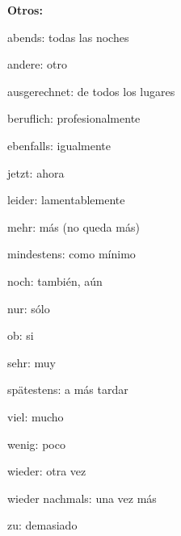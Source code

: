 \textbf{Otros:}
\begin{multicols}{3}
\begin{myitemize}
\item abends: todas las noches
\item andere: otro
\item ausgerechnet: de todos los lugares
\item beruflich: profesionalmente
\item ebenfalls: igualmente
\item jetzt: ahora
\item leider: lamentablemente
\item mehr: más (no queda más)
\item mindestens: como mínimo
\item noch: también, aún
\item nur: sólo
\item ob: si
\item sehr: muy
\item spätestens: a más tardar
\item viel: mucho
\item wenig: poco
\item wieder: otra vez
\item wieder nachmals: una vez más
\item zu: demasiado
\end{myitemize}
\end{multicols}


